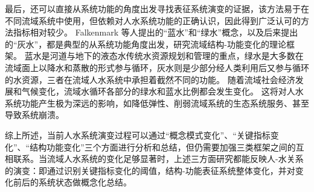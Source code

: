 最后，还可以直接从系统功能的角度出发寻找表征系统演变的证据，该方法易于在不同流域系统中使用，但依赖对人水系统功能的正确认识，因此得到广泛认可的方法指标相对较少。
Falkenmark 等人提出的“蓝水”和“绿水”概念\cite{falkenmark2006}，以及后来提出的“灰水”，都是典型的从系统功能角度出发，研究流域结构-功能变化的理论框架\cite{mekonnen2011}。
蓝水是河道与地下的液态水传统水资源规划和管理的重点，绿水是大多数在流域面上以降水和蒸散的形式参与循环，灰水则是少部分经人类利用后又参与循环的水资源，三者在流域人水系统中承担着截然不同的功能\cite{craswell2007}。
随着流域社会经济发展和气候变化，流域水循环各部分的绿水和蓝水比例都会发生变化。
这将对人水系统功能产生极为深远的影响，如降低弹性、削弱流域系统的生态系统服务、甚至导致系统崩溃\cite{falkenmark2019}。

综上所述，当前人水系统演变过程可以通过“概念模式变化”、“关键指标变化”、“结构功能变化”三个方面进行分析和总结，但仍需要加强三类框架之间的互相联系。当流域人水系统的变化足够显著时，上述三方面研究都能反映人-水关系的演变：即通过识别关键指标变化的阈值，结构-功能表征系统整体变化，并对变化前后的系统状态做概念化总结。

